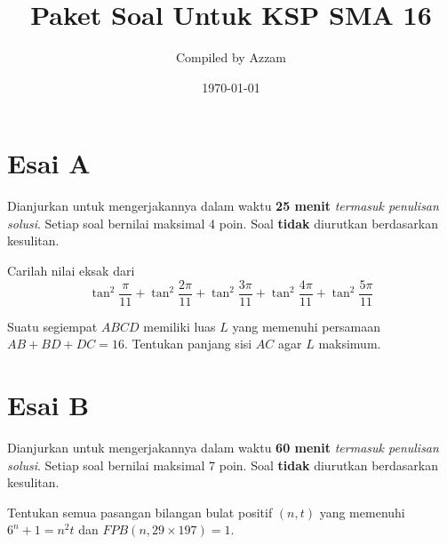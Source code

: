 \documentclass[12pt]{scrartcl}
\begin{document}
	\title{Paket Soal Untuk KSP SMA 16} %
	\date{\today}
	\author{Compiled by Azzam}
	\maketitle

\renewcommand*\contentsname{Daftar Isi}
\tableofcontents

\newpage
	

	\section{Esai A}
	Dianjurkan untuk mengerjakannya dalam waktu \textbf{25 menit} \textit{termasuk penulisan solusi}. Setiap soal bernilai maksimal 4 poin. Soal \textbf{tidak} diurutkan berdasarkan kesulitan. 
	
	\begin{soalbaru}
	Carilah nilai eksak dari $$\tan^2 \frac{\pi}{11}+\tan^2 \frac{2\pi}{11}+\tan^2 \frac{3\pi}{11}+\tan^2 \frac{4\pi}{11}+\tan^2 \frac{5\pi}{11}$$
	\end{soalbaru}
	
	\begin{soalbaru}
	Suatu segiempat $ABCD$ memiliki luas $L$ yang memenuhi persamaan $AB+BD+DC=16$. Tentukan panjang sisi $AC$ agar $L$ maksimum.
	\end{soalbaru}
	
	\section{Esai B}
	Dianjurkan untuk mengerjakannya dalam waktu \textbf{60 menit} \textit{termasuk penulisan solusi}. Setiap soal bernilai maksimal 7 poin. Soal \textbf{tidak} diurutkan berdasarkan kesulitan.
	
	\begin{soalbaru}
		Tentukan semua pasangan bilangan bulat positif $(n,t)$ yang memenuhi $6^n+1=n^2t$ dan $FPB(n, 29\times 197)=1$.
	\end{soalbaru} 
	
\end{document}

